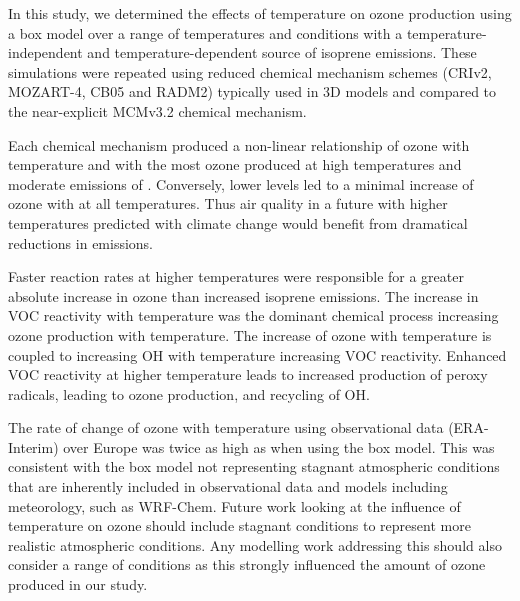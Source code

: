 In this study, we determined the effects of temperature on ozone production using a box model over a range of temperatures and  conditions with a temperature-independent and temperature-dependent source of isoprene emissions.
These simulations were repeated using reduced chemical mechanism schemes (CRIv2, MOZART-4, CB05 and RADM2) typically used in 3D models and compared to the near-explicit MCMv3.2 chemical mechanism.

Each chemical mechanism produced a non-linear relationship of ozone with temperature and  with the most ozone produced at high temperatures and moderate emissions of .
Conversely, lower  levels led to a minimal increase of ozone with at all temperatures.
Thus air quality in a future with higher temperatures predicted with climate change would benefit from dramatical reductions in  emissions.

Faster reaction rates at higher temperatures were responsible for a greater absolute increase in ozone than increased isoprene emissions.
The increase in VOC reactivity with temperature was the dominant chemical process increasing ozone production with temperature.
The increase of ozone with temperature is coupled to increasing OH with temperature increasing VOC reactivity.
Enhanced VOC reactivity at higher temperature leads to increased production of peroxy radicals, leading to ozone production, and recycling of OH.

The rate of change of ozone with temperature using observational data (ERA-Interim) over Europe was twice as high as when using the box model.
This was consistent with the box model not representing stagnant atmospheric conditions that are inherently included in observational data and models including meteorology, such as WRF-Chem.
Future work looking at the influence of temperature on ozone should include stagnant conditions to represent more realistic atmospheric conditions.
Any modelling work addressing this should also consider a range of  conditions as this strongly influenced the amount of ozone produced in our study.
